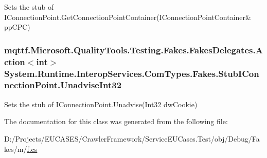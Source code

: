 Sets the stub of I\-Connection\-Point.\-Get\-Connection\-Point\-Container(I\-Connection\-Point\-Container\& pp\-C\-P\-C)

\hypertarget{class_system_1_1_runtime_1_1_interop_services_1_1_com_types_1_1_fakes_1_1_stub_i_connection_point_a0f3cdb53129f5b23d525603177352805}{
\subsubsection[{Unadvise\-Int32}]{\setlength{\rightskip}{0pt plus 5cm}mqttf.\-Microsoft.\-Quality\-Tools.\-Testing.\-Fakes.\-Fakes\-Delegates.\-Action$<$int$>$ System.\-Runtime.\-Interop\-Services.\-Com\-Types.\-Fakes.\-Stub\-I\-Connection\-Point.\-Unadvise\-Int32}}\label{class_system_1_1_runtime_1_1_interop_services_1_1_com_types_1_1_fakes_1_1_stub_i_connection_point_a0f3cdb53129f5b23d525603177352805}


Sets the stub of I\-Connection\-Point.\-Unadvise(\-Int32 dw\-Cookie)



The documentation for this class was generated from the following file\-:\begin{DoxyCompactItemize}
\item 
D\-:/\-Projects/\-E\-U\-C\-A\-S\-E\-S/\-Crawler\-Framework/\-Service\-E\-U\-Cases.\-Test/obj/\-Debug/\-Fakes/m/\hyperlink{m_2f_8cs}{f.\-cs}\end{DoxyCompactItemize}
